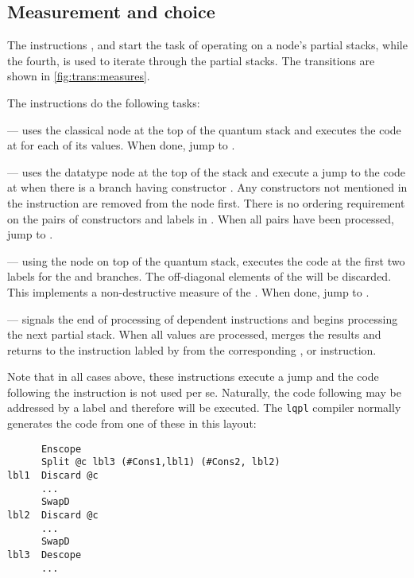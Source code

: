 \subsection{Measurement and choice}\label{subsec:measurementandchoice}
The instructions
,  and  start the task of 
operating on a node's partial stacks, while the fourth,  
is used to iterate through the partial stacks. The transitions are shown in 
\vref{fig:trans:measures}.

The instructions do the following tasks:
\begin{description}
\item{} --- uses the classical node at the top
of the quantum stack and executes the code at  for
each of its values. When done, jump to .
\item{} --- uses the
datatype node at the top of the stack and
execute a jump to the code 
at  when there is a branch having constructor
. Any constructors not mentioned in the instruction 
are removed from the node first. There is no ordering 
requirement on the pairs of constructors and labels in . When all 
pairs have been processed, jump to .
\item{} --- using the
\qubit{} node on top of the quantum stack, executes
 the code at the first two labels for 
 the  and  branches. 
The off-diagonal elements  of the \qubit{} will be
discarded. This implements a 
non-destructive measure of the \qubit. When done, jump to .
\item{} --- signals the end of processing of dependent 
instructions and begins processing the next partial stack.
 When all values are processed, merges the results and returns
to the instruction labled by  from the corresponding , 
or  instruction.
\end{description}
Note that in all cases above, these instructions execute a jump and the code following the 
instruction is not used per se. Naturally, the code following may be addressed by a label and therefore
will be executed. The \texttt{lqpl} compiler normally generates the code from one of these in
this layout:
\begin{verbatim}
      Enscope
      Split @c lbl3 (#Cons1,lbl1) (#Cons2, lbl2)
lbl1  Discard @c
      ...
      SwapD
lbl2  Discard @c
      ...
      SwapD
lbl3  Descope
      ...
\end{verbatim}

